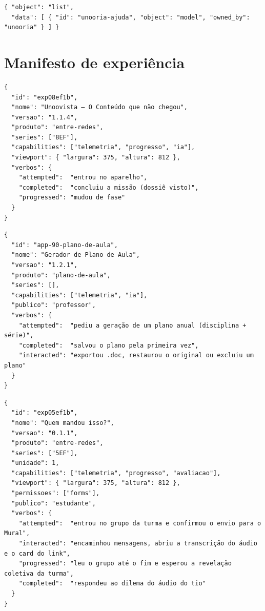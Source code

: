 \begin{lstlisting}[language=jsonunoo, caption={\rota{GET /ajuda/llm/models} --- o que o \emph{vendor} recebe na abertura}]
{ "object": "list",
  "data": [ { "id": "unooria-ajuda", "object": "model", "owned_by": "unooria" } ] }
\end{lstlisting}

\section{Manifesto de experiência}

\begin{lstlisting}[language=jsonunoo, caption={\arq{public/experiencia.json} --- exp08ef1b, com \cd{viewport}}]
{
  "id": "exp08ef1b",
  "nome": "Unoovista — O Conteúdo que não chegou",
  "versao": "1.1.4",
  "produto": "entre-redes",
  "series": ["8EF"],
  "capabilities": ["telemetria", "progresso", "ia"],
  "viewport": { "largura": 375, "altura": 812 },
  "verbos": {
    "attempted":  "entrou no aparelho",
    "completed":  "concluiu a missão (dossiê visto)",
    "progressed": "mudou de fase"
  }
}
\end{lstlisting}

\begin{lstlisting}[language=jsonunoo, caption={\arq{public/experiencia.json} --- app-90, ferramenta de professor}]
{
  "id": "app-90-plano-de-aula",
  "nome": "Gerador de Plano de Aula",
  "versao": "1.2.1",
  "produto": "plano-de-aula",
  "series": [],
  "capabilities": ["telemetria", "ia"],
  "publico": "professor",
  "verbos": {
    "attempted":  "pediu a geração de um plano anual (disciplina + série)",
    "completed":  "salvou o plano pela primeira vez",
    "interacted": "exportou .doc, restaurou o original ou excluiu um plano"
  }
}
\end{lstlisting}

\begin{lstlisting}[language=jsonunoo, caption={\arq{public/experiencia.json} --- exp05ef1b, com \cd{permissoes}}]
{
  "id": "exp05ef1b",
  "nome": "Quem mandou isso?",
  "versao": "0.1.1",
  "produto": "entre-redes",
  "series": ["5EF"],
  "unidade": 1,
  "capabilities": ["telemetria", "progresso", "avaliacao"],
  "viewport": { "largura": 375, "altura": 812 },
  "permissoes": ["forms"],
  "publico": "estudante",
  "verbos": {
    "attempted":  "entrou no grupo da turma e confirmou o envio para o Mural",
    "interacted": "encaminhou mensagens, abriu a transcrição do áudio e o card do link",
    "progressed": "leu o grupo até o fim e esperou a revelação coletiva da turma",
    "completed":  "respondeu ao dilema do áudio do tio"
  }
}
\end{lstlisting}

